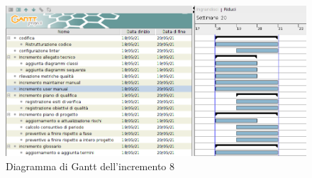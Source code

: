 \begin{figure}[!ht]
    \caption{Diagramma di Gantt dell'incremento 8}
    \vspace{5px}
    \includegraphics[scale=0.3]{../../../Images/Diagrammi/Gantt/incremento8.png}
    \centering
\end{figure}

